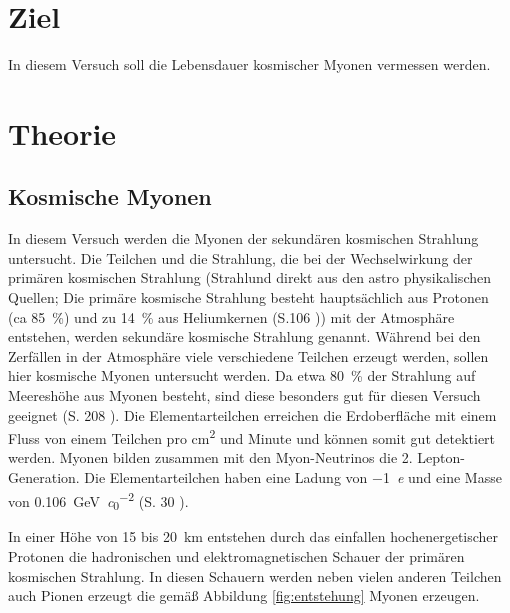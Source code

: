 \section{Ziel}
In diesem Versuch soll die Lebensdauer kosmischer Myonen vermessen werden.
\section{Theorie}
\label{sec:Theorie}
\subsection{Kosmische Myonen}
\label{sec:myonen}
In diesem Versuch werden die Myonen der sekundären kosmischen Strahlung untersucht.
Die Teilchen und die Strahlung, die bei der Wechselwirkung der primären kosmischen Strahlung (Strahlund direkt aus den astro physikalischen Quellen; Die primäre kosmische Strahlung besteht hauptsächlich aus Protonen (ca \SI{85}{\percent}) und zu \SI{14}{\percent} aus Heliumkernen (S.\num{106} \cite{source1})) mit der Atmosphäre entstehen, werden sekundäre kosmische Strahlung genannt.
Während bei den Zerfällen in der Atmosphäre viele verschiedene Teilchen erzeugt werden, sollen hier kosmische Myonen untersucht werden.
Da etwa \SI{80}{\percent} der Strahlung auf Meereshöhe aus Myonen besteht, sind diese besonders gut für diesen Versuch geeignet (S. \num{208} \cite{source1}).
Die Elementarteilchen erreichen die Erdoberfläche mit einem Fluss von einem Teilchen pro \si{\square \centi \metre} und Minute und können somit gut detektiert werden.
Myonen bilden zusammen mit den Myon-Neutrinos die 2. Lepton-Generation.
Die Elementarteilchen haben eine Ladung von \SI{-1}{\elementarycharge} und eine Masse von \SI[per-mode=symbol]{0.106}{\giga \eV \per \clight \squared} (S. \num{30} \cite{source1}).

In einer Höhe von \num{15} bis \SI{20}{\kilo\metre} entstehen durch das einfallen hochenergetischer Protonen die hadronischen und elektromagnetischen Schauer der primären kosmischen Strahlung.
In diesen Schauern werden neben vielen anderen Teilchen auch Pionen erzeugt die gemäß Abbildung \ref{fig:entstehung} Myonen erzeugen.


